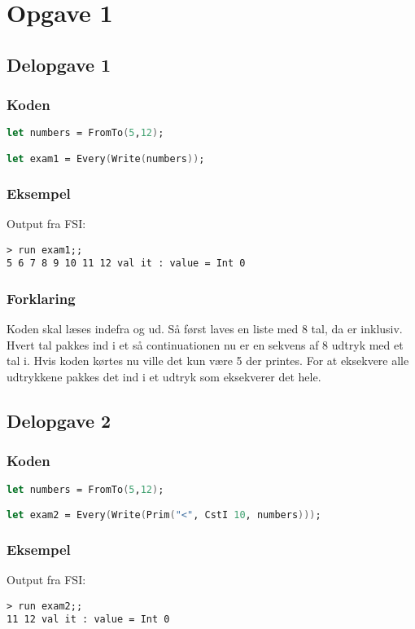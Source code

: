 \section{Opgave 1}
\subsection{Delopgave 1}\label{ass:1-1}
\subsubsection{Koden}
\begin{lstlisting}[language=fsharp]
let numbers = FromTo(5,12);

let exam1 = Every(Write(numbers));
\end{lstlisting}
\subsubsection{Eksempel}
Output fra FSI:
\begin{lstlisting}
> run exam1;;
5 6 7 8 9 10 11 12 val it : value = Int 0
\end{lstlisting}

\subsubsection{Forklaring}
Koden skal læses indefra og ud. Så først laves en liste med 8 tal, da  er inklusiv. Hvert tal pakkes ind i et  så continuationen nu er en sekvens af 8  udtryk med et tal i. Hvis koden kørtes nu ville det kun være 5 der printes. For at eksekvere alle udtrykkene pakkes det ind i et  udtryk som eksekverer det hele.

\subsection{Delopgave 2}\label{ass:1-2}
\subsubsection{Koden}
\begin{lstlisting}[language=fsharp]
let numbers = FromTo(5,12);

let exam2 = Every(Write(Prim("<", CstI 10, numbers)));
\end{lstlisting}

\subsubsection{Eksempel}
Output fra FSI:
\begin{lstlisting}
> run exam2;;
11 12 val it : value = Int 0
\end{lstlisting}

